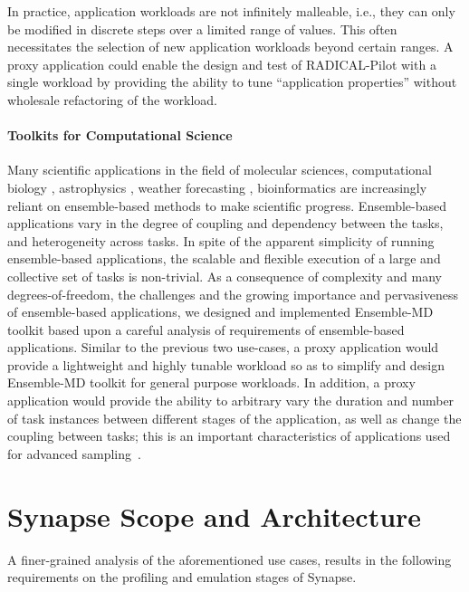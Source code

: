 \documentclass[10pt, conference, compsocconf]{IEEEtran}
\newcommand{\synapse}{Synapse\xspace}
\newcommand{\Synapse}{Synapse\xspace}
\newcommand{\rp}{RADICAL-Pilot\xspace}
\newcommand{\enmd}{Ensemble-MD toolkit\xspace}
\begin{document}
In practice, application workloads are not infinitely malleable, i.e., they can
only be modified in discrete steps over a limited range of values.  This often
necessitates the selection of new application workloads beyond certain ranges.
A proxy application could enable the design and test of \rp with a single
workload by providing the ability to tune ``application properties'' without
wholesale refactoring of the workload.

\paragraph{Toolkits for Computational Science} 
Many scientific applications in the field of molecular sciences, computational
biology \cite{preto2014fast}, astrophysics \cite{sirko2005initial}, weather
forecasting \cite{bauer2015quiet}, bioinformatics \cite{ martin2010rnnotator}
are increasingly reliant on ensemble-based methods to make scientific
progress. Ensemble-based applications vary in the degree of coupling and
dependency between the tasks, and heterogeneity across tasks. In spite of the
apparent simplicity of running ensemble-based applications, the scalable and
flexible execution of a large and collective set of tasks is non-trivial.  As a
consequence of complexity and many degrees-of-freedom, the challenges and the
growing importance and pervasiveness of ensemble-based applications, we designed
and implemented \enmd based upon a careful analysis of requirements of
ensemble-based applications. Similar to the previous two use-cases, a proxy
application would provide a lightweight and highly tunable workload so as to
simplify and design \enmd for general purpose workloads. In addition, a proxy
application would provide the ability to arbitrary vary the duration and number
of task instances between different stages of the application, as well as change
the coupling between tasks; this is an important characteristics of applications
used for advanced sampling~\cite{enmd}.







\section{\Synapse Scope and Architecture}
 \label{sec:arch}

 A finer-grained analysis of the aforementioned use cases, results in the
 following requirements on the profiling and emulation stages of \synapse.
\end{document}
